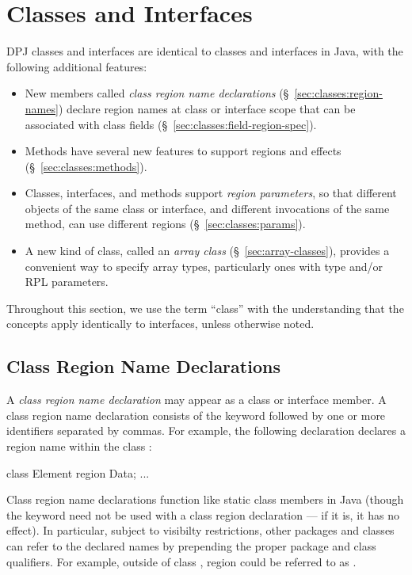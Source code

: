 \section{Classes and Interfaces%
\label{sec:classes}}

DPJ classes and interfaces are identical to classes and interfaces in
Java, with the following additional features:
%
\begin{itemize}
%
\item New members called \emph{class region name declarations}
  (\S~\ref{sec:classes:region-names}) declare region names at class or
  interface scope that can be associated with class fields
  (\S~\ref{sec:classes:field-region-spec}).
%
\item Methods have several new features to support regions and effects
  (\S~\ref{sec:classes:methods}).
%
\item Classes, interfaces, and methods support \emph{region
  parameters}, so that different objects of the same class or
  interface, and different invocations of the same method, can use
  different regions (\S~\ref{sec:classes:params}).
%
\item A new kind of class, called an \emph{array class}
  (\S~\ref{sec:array-classes}), provides a convenient way to specify
  array types, particularly ones with type and/or RPL parameters.
%
\end{itemize}
%
Throughout this section, we use the term ``class'' with the
understanding that the concepts apply identically to interfaces,
unless otherwise noted.

\subsection{Class Region Name Declarations%
\label{sec:classes:region-names}}

A \emph{class region name declaration} may appear as a class or
interface member.  A class region name declaration consists of the
keyword  followed by one or more identifiers separated by
commas. For example, the following declaration declares a region name
 within the class :

\begin{dpjlisting}
class Element {
  region Data;
  ...
}
\end{dpjlisting}

Class region name declarations function like static class members in
Java (though the keyword  need not be used with a class
region declaration --- if it is, it has no effect).  In particular,
subject to visibilty restrictions, other packages and classes can
refer to the declared names by prepending the proper package and class
qualifiers.  For example, outside of class , region
 could be referred to as .

